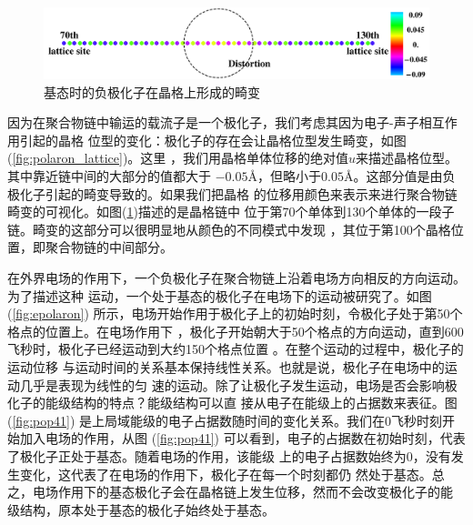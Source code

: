 \documentclass[12pt,]{report}
\begin{document}
\begin{figure}[h!]
    \centering
    \includegraphics[scale=0.5]{./figures/chain.png}
    \caption{基态时的负极化子在晶格上形成的畸变}
    \label{fig:chain}
\end{figure}

因为在聚合物链中输运的载流子是一个极化子，我们考虑其因为电子-声子相互作用引起的晶格
位型的变化：极化子的存在会让晶格位型发生畸变，如图(\ref{fig:polaron_lattice})。这里
，我们用晶格单体位移的绝对值\(u\)来描述晶格位型。其中靠近链中间的大部分的值都大于
\(-0.05\)\AA，但略小于\(0.05\)\AA。这部分值是由负极化子引起的畸变导致的。如果我们把晶格
的位移用颜色来表示来进行聚合物链畸变的可视化。如图(\ref{fig:chain})描述的是晶格链中
位于第70个单体到130个单体的一段子链。畸变的这部分可以很明显地从颜色的不同模式中发现
，其位于第100个晶格位置，即聚合物链的中间部分。

在外界电场的作用下，一个负极化子在聚合物链上沿着电场方向相反的方向运动。为了描述这种
运动，一个处于基态的极化子在电场下的运动被研究了。如图
(\ref{fig:epolaron})
所示，电场开始作用于极化子上的初始时刻，令极化子处于第50个格点的位置上。在电场作用下
，极化子开始朝大于50个格点的方向运动，直到600飞秒时，极化子已经运动到大约150个格点位置
。在整个运动的过程中，极化子的运动位移
与运动时间的关系基本保持线性关系。也就是说，极化子在电场中的运动几乎是表现为线性的匀
速的运动。除了让极化子发生运动，电场是否会影响极化子的能级结构的特点？能级结构可以直
接从电子在能级上的占据数来表征。图 (\ref{fig:pop41})
是上局域能级的电子占据数随时间的变化关系。我们在0飞秒时刻开始加入电场的作用，从图
(\ref{fig:pop41})
可以看到，电子的占据数在初始时刻，代表了极化子正处于基态。随着电场的作用，该能级
上的电子占据数始终为0，没有发生变化，这代表了在电场的作用下，极化子在每一个时刻都仍
然处于基态。总之，电场作用下的基态极化子会在晶格链上发生位移，然而不会改变极化子的能
级结构，原本处于基态的极化子始终处于基态。
\end{document}
